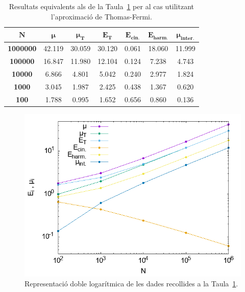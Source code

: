 \documentclass[a4paper]{article}
\begin{document}
\begin{table}[H]
    \centering
    \begin{tabular}{|c|c|c|c|c|c|c|}
    \hline
        \rowcolor[HTML]{EFEFEF}
        $\mathbf{N}$ & $\boldsymbol{\mu}$ & $\boldsymbol{\mu_{\textbf{T}}}$ & $\boldsymbol{E_{\textbf{T}}}$ & $\boldsymbol{E_{\textbf{cin.}}}$ & $\boldsymbol{E_{\textbf{harm.}}}$ & $\boldsymbol{\mu_{\textbf{inter.}}}$ \\ \hline\hline
        \textbf{1000000} & 42.119 & 30.059 & 30.120 & 0.061 & 18.060 & 11.999 \\ \hline
        \textbf{100000} & 16.847 & 11.980 & 12.104 & 0.124 & 7.238 & 4.743 \\ \hline
        \textbf{10000} & 6.866 & 4.801 & 5.042 & 0.240 & 2.977 & 1.824 \\ \hline
        \textbf{1000} & 3.045 & 1.987 & 2.425 & 0.438 & 1.367 & 0.620 \\ \hline
        \textbf{100} & 1.788 & 0.995 & 1.652 & 0.656 & 0.860 & 0.136 \\ \hline
    \end{tabular}
\caption{Resultats equivalents als de la Taula~\ref{tab:res_a} per al cas utilitzant l'aproximació de Thomas-Fermi.}
\label{tab:res_a}
\end{table}

\begin{figure}[H]
    \centering
    \includegraphics[scale=0.55]{../a.png}
\caption{Representació doble logarítmica de les dades recollides a la Taula~\ref{tab:res_a}.}
\label{fig:res_a}
\end{figure}
\end{document}
